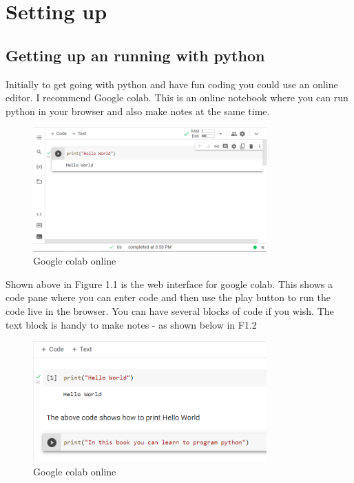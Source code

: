 \documentclass[12pt,a4paper, blue]{bbe}
\begin{document}
	\chapter{Setting up}
	
	\section{Getting up an running with python}
	
	Initially to get going with python and have fun coding you could use an online editor. I recommend Google colab. This is an online notebook where you can run python in your browser and also make notes at the same time.
	\vspace{1cm}
	
	\begin{figure}[h]
        \centering
        \includegraphics[width=0.8\textwidth]{images/ch1/colab1.PNG}
        \caption{Google colab online}
        \label{fig:mesh1}
    \end{figure}
    \vspace{5mm}
    
    Shown above in Figure 1.1 is the web interface for google colab. This shows a code pane where you can enter code and then use the play button to run the code live in the browser. You can have several blocks of code if you wish. The text block is handy to make notes - as shown below in F1.2
	\vspace{1cm}
	\begin{figure}[h]
        \centering
        \includegraphics[width=0.8\textwidth]{images/ch1/colab2.PNG}
        \caption{Google colab online}
        
    \end{figure}
	
\end{document}
